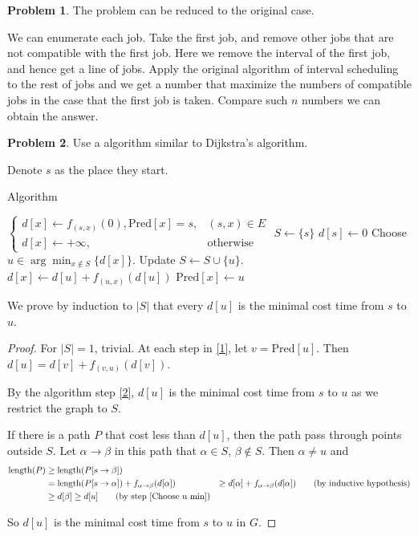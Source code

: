 \documentclass[a4paper]{article}
\theoremstyle{definition}
\newtheorem{problem}{Problem}
\theoremstyle{plain}
\newcommand{\dps}{\displaystyle}
\numberwithin{equation}{problem}
\begin{document}
\begin{problem}
  The problem can be reduced to the original case.
  
  We can enumerate each job. Take the first job, and remove other jobs that are not compatible with the first job. Here we remove the interval of the first job, and hence get a line of jobs. Apply the original algorithm of interval scheduling to the rest of jobs and we get a number that maximize the numbers of compatible jobs in the case that the first job is taken. Compare such  $ n $  numbers we can obtain the answer. 
\end{problem}
\begin{problem}
  Use a algorithm similar to Dijkstra's algorithm.

  Denote  $ s $  as the place they start.
  \begin{algorithm}
    \caption{Algorithm}
    \label{alg:dijkstra}
    \begin{algorithmic}[1]
      \STATE   
      $ \begin{cases}
        d[x]\leftarrow f_{(s,x)}(0),\mathrm{Pred}[x]=s,&(s,x)\in E\\
        d[x]\leftarrow+\infty,&\text{otherwise}
      \end{cases}  $ 
      \STATE  $ S\leftarrow\{s\} $ 
      \STATE  $ d[s]\leftarrow 0 $ 
        \STATE Choose  $ u\in \dps\arg\min_{x\not\in S}\{d[x]\} $.\label{Choose u min}
        \STATE Update  $ S\leftarrow S\cup\{u\} $.\label{1}
        \label{2}
                \STATE  $ d[x]\leftarrow d[u]+f_{(u,x)}(d[u]) $  
                \STATE  $ \mathrm{Pred}[x]\leftarrow u $  
            \ENDIF
        \ENDFOR 
    \ENDWHILE
    \end{algorithmic}
\end{algorithm}
We prove by induction to  $ |S| $   that every  $ d[u] $ is the minimal cost time from  $ s $ to  $ u $.   
\begin{proof}
  For  $ |S|=1 $, trivial.
  At each step in \ref{1},  let  $ v=\mathrm{Pred}[u] $. Then  $ d[u]=d[v]+f_{(v,u)}(d[v]) $.

  By the algorithm step \ref{2},  $ d[u] $ is the minimal cost time from  $ s $ to  $ u $ as we restrict the graph to  $ S $.   
  
  If there is a path $ P $  that cost less than  $ d[u] $, then the path pass through points outside  $ S $. Let  $ \alpha\to \beta $ in this path that  $ \alpha\in S $,  $ \beta\not\in S $. Then  $ \alpha\neq u $ and  
  \begin{align*}
    \mathrm{length}(P)& \geq \mathrm{length}(P[s\rightarrow\beta])\\
    & =\mathrm{length}(P[s\rightarrow\alpha])+f_{\alpha\to \beta}(d[\alpha])\
    & \geq d[\alpha]+f_{\alpha\to \beta}(d[\alpha])\qquad(\text{by inductive hypothesis})\\
    & \geq d[\beta] \geq d[u]\qquad(\text{by step \ref{Choose u min}})
  \end{align*}

  So  $ d[u] $ is the minimal cost time from  $ s $ to  $ u $ in  $ G $.    
\end{proof}
\end{problem}
\end{document}
